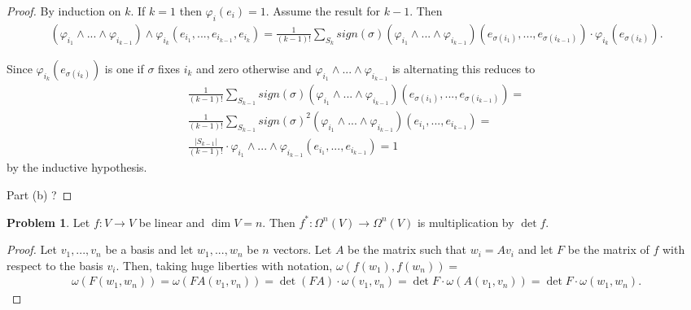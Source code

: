 \documentclass[20pt]{article}
\theoremstyle{plain}
\theoremstyle{definition}
\newtheorem*{problem}{Problem}
\begin{document}
\begin{proof}
  By induction on $k$.
  If $k = 1$ then $\varphi_i(e_i) = 1.$
  Assume the result for $k-1$. Then
  \begin{align*}
    (\varphi_{i_{1}} \wedge ... \wedge \varphi_{i_{k-1}}) \wedge \varphi_{i_{k}}
    (e_{i_1}, ..., e_{i_{k-1}}, e_{i_{k}})=
    \frac{1}{(k-1)!} \sum_{S_k}sign(\sigma)(\varphi_{i_{1}} \wedge ... \wedge \varphi_{i_{k-1}})(e_{\sigma(i_1)}, ..., e_{\sigma(i_{k-1})}) \cdot
     \varphi_{i_{k}}(e_{\sigma(i_k)}).
  \end{align*}

  Since $\varphi_{i_{k}}(e_{\sigma(i_k)})$ is one if $\sigma$ fixes $i_k$ and zero otherwise and
  $\varphi_{i_{1}} \wedge ... \wedge \varphi_{i_{k-1}}$ is alternating this reduces to 
  \begin{align*}
    \frac{1}{(k-1)!} \sum_{S_{k-1}}sign(\sigma)(\varphi_{i_{1}} \wedge ... \wedge \varphi_{i_{k-1}})(e_{\sigma(i_1)}, ..., e_{\sigma(i_{k-1})}) = \\
    \frac{1}{(k-1)!} \sum_{S_{k-1}}sign(\sigma)^2(\varphi_{i_{1}} \wedge ... \wedge \varphi_{i_{k-1}})(e_{i_1}, ..., e_{i_{k-1}}) = \\
    \frac{|S_{k-1}|}{(k-1)!} \cdot  \varphi_{i_{1}} \wedge ... \wedge \varphi_{i_{k-1}} (e_{i_1}, ..., e_{i_{k-1}}) = 1
  \end{align*}
  by the inductive hypothesis.

  \color{ForestGreen} Part (b) ?
\end{proof}


  \begin{problem}{4.2}
    Let $f: V \to V$ be linear and $\dim V = n$.
    Then $f^*: \Omega^n(V) \to \Omega^n(V)$ is multiplication by $\det f$.
  \end{problem}

  \begin{proof}
    Let $v_1, ..., v_n$ be a basis and let $w_1, ..., w_n$ be $n$ vectors.
    Let $A$ be the matrix such that $w_i = Av_i$ and let $F$ be the matrix 
    of $f$ with respect to the basis $v_i$.  Then, taking huge liberties with 
    notation, $\omega(f(w_1), f(w_n)) = $
    \begin{align*}
      \omega(F(w_1,w_n)) = 
      \omega(FA(v_1,v_n)) = 
      \det(FA)\cdot \omega(v_1, v_n) = 
      \det F \cdot \omega(A(v_1, v_n)) = 
      \det F \cdot \omega(w_1, w_n).
    \end{align*}
  \end{proof}
\end{document}
